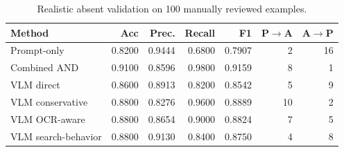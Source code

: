 \begin{table}[t]
\centering
\small
\begin{tabular}{lrrrrrr}
\toprule
Method & Acc & Prec. & Recall & F1 & P$\rightarrow$A & A$\rightarrow$P \\
\midrule
Prompt-only & 0.8200 & 0.9444 & 0.6800 & 0.7907 & 2 & 16 \\
Combined AND & 0.9100 & 0.8596 & 0.9800 & 0.9159 & 8 & 1 \\
VLM direct & 0.8600 & 0.8913 & 0.8200 & 0.8542 & 5 & 9 \\
VLM conservative & 0.8800 & 0.8276 & 0.9600 & 0.8889 & 10 & 2 \\
VLM OCR-aware & 0.8800 & 0.8654 & 0.9000 & 0.8824 & 7 & 5 \\
VLM search-behavior & 0.8800 & 0.9130 & 0.8400 & 0.8750 & 4 & 8 \\
\bottomrule
\end{tabular}
\caption{Realistic absent validation on 100 manually reviewed examples.}
\label{tab:realistic_absent_validation}
\end{table}
